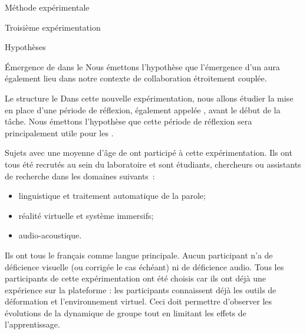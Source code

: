 \documentclass[myfrancais,ngerman,english,frenchb]{mythesis}
\begin{document}
\begin{mychapter}{Méthode expérimentale}
\begin{mysection}{Troisième expérimentation}
\begin{mysubsection}{Hypothèses}
\begin{myparagraph}{ Émergence de  dans le }
					Nous émettons l'hypothèse que l'émergence d'un  aura également lieu dans notre contexte de collaboration étroitement couplée.
				\end{myparagraph}
				\begin{myparagraph}{ Le \mybrainstorming structure le }
					Dans cette nouvelle expérimentation, nous allons étudier la mise en place d'une période de réflexion, également appelée \mybrainstorming, avant le début de la tâche.
					Nous émettons l'hypothèse que cette période de réflexion sera principalement utile pour les .
				\end{myparagraph}
			\end{mysubsection}
			\begin{mysubsection}{Sujets}
				 avec une moyenne d'âge de  ont participé à cette expérimentation.
				Ils ont tous été recrutés au sein du laboratoire  et sont étudiants, chercheurs ou assistants de recherche dans les domaines suivants~:
				\begin{itemize}
					\item linguistique et traitement automatique de la parole;
					\item réalité virtuelle et système immersifs;
					\item audio-acoustique.
				\end{itemize}
				Ils ont tous le français comme langue principale.
				Aucun participant n'a de déficience visuelle (ou corrigée le cas échéant) ni de déficience audio.
				Tous les participants de cette expérimentation ont été choisis car ils ont déjà une expérience sur la plateforme : les participants connaissent déjà les outils de déformation et l'environnement virtuel.
				Ceci doit permettre d'observer les évolutions de la dynamique de groupe tout en limitant les effets de l'apprentissage.


\end{mysubsection}
\end{mysection}
\end{mychapter}
\end{document}
